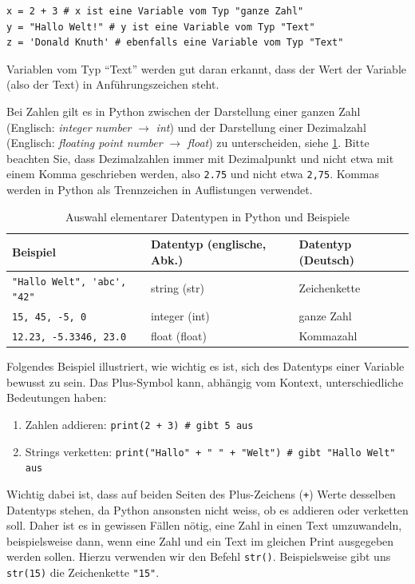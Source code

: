 \begin{lstlisting}
x = 2 + 3 # x ist eine Variable vom Typ "ganze Zahl"
y = "Hallo Welt!" # y ist eine Variable vom Typ "Text"
z = 'Donald Knuth' # ebenfalls eine Variable vom Typ "Text"
\end{lstlisting}

Variablen vom Typ \enquote{Text} werden gut daran erkannt, dass der Wert der Variable (also der Text) in Anführungszeichen steht.

Bei Zahlen gilt es in Python zwischen der Darstellung einer ganzen Zahl (Englisch: \emph{integer number} $\rightarrow$ \emph{int}) und der Darstellung einer Dezimalzahl (Englisch: \emph{floating point number} $\rightarrow$ \emph{float}) zu unterscheiden, siehe \cref{tab:datatypes}. Bitte beachten Sie, dass Dezimalzahlen immer mit Dezimalpunkt und nicht etwa mit einem Komma geschrieben werden, also \lstinline|2.75| und nicht etwa \lstinline|2,75|. Kommas werden in Python als Trennzeichen in Auflistungen verwendet.

\begin{table}[H]
	\footnotesize
	\centering
	\begin{tabular}{l|l|l}
		\textbf{Beispiel}                     & \textbf{Datentyp (englische, Abk.)} & \textbf{Datentyp (Deutsch)} \\\midrule\midrule
		\lstinline|"Hallo Welt", 'abc', "42"| & string (str)                        & Zeichenkette                \\\midrule
		\lstinline|15, 45, -5, 0|             & integer (int)                       & ganze Zahl                  \\\midrule
		\lstinline|12.23, -5.3346, 23.0|      & float (float)                       & Kommazahl
	\end{tabular}
	\caption{Auswahl elementarer Datentypen in Python und Beispiele}
	\label{tab:datatypes}
\end{table}

Folgendes Beispiel illustriert, wie wichtig es ist, sich des Datentyps einer Variable bewusst zu sein. Das Plus-Symbol kann, abhängig vom Kontext, unterschiedliche Bedeutungen haben:
\begin{enumerate}
	\item Zahlen addieren: \lstinline|print(2 + 3) # gibt 5 aus|
	\item Strings verketten: \lstinline|print("Hallo" + " " + "Welt") # gibt "Hallo Welt" aus|
\end{enumerate}
Wichtig dabei ist, dass auf beiden Seiten des Plus-Zeichens (\lstinline|+|) Werte desselben Datentyps stehen, da Python ansonsten nicht weiss, ob es addieren oder verketten soll. Daher ist es in gewissen Fällen nötig, eine Zahl in einen Text umzuwandeln, beispielsweise dann, wenn eine Zahl und ein Text im gleichen Print ausgegeben werden sollen. Hierzu verwenden wir den Befehl \lstinline|str()|. Beispielsweise gibt uns \lstinline|str(15)| die Zeichenkette \lstinline|"15"|.


